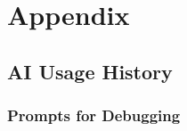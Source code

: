 \documentclass[class=report,11pt,crop=false]{standalone}
\begin{document}
	\chapter{Appendix}

	\section{AI Usage History}
	
	\subsection{Prompts for Debugging}
	
	\ifstandalone
	
	\printnoidxglossary[type=\acronymtype,nonumberlist]
	\fi
\end{document}
